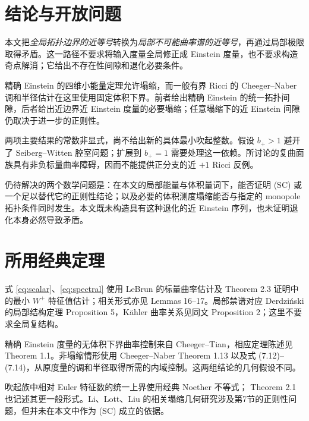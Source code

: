 \documentclass[UTF8,fontset=fandol,zihao=-4]{ctexart}
\theoremstyle{cn}
\numberwithin{equation}{section}
\begin{document}
\section{结论与开放问题}

本文把\emph{全局拓扑边界的近等号}转换为\emph{局部不可能曲率谱的近等号}，再通过局部极限取得矛盾。这一路径不要求将输入度量全局修正成 Einstein 度量，也不要求构造奇点解消；它给出不存在性间隙和退化必要条件。

精确 Einstein 的四维小能量定理允许塌缩，而一般有界 Ricci 的 Cheeger--Naber 调和半径估计在这里使用固定体积下界。前者给出精确 Einstein 的统一拓扑间隙，后者给出近边界近 Einstein 度量的必要塌缩；任意塌缩下的近 Einstein 间隙仍取决于进一步的正则性。

两项主要结果的常数非显式，尚不给出新的具体最小吹起整数。假设 $b_+>1$ 避开了 Seiberg--Witten 腔室问题；扩展到 $b_+=1$ 需要处理这一依赖。所讨论的复曲面族具有非负标量曲率障碍，因而不能提供正分支的近 $+1$ Ricci 反例。

仍待解决的两个数学问题是：在本文的局部能量与体积量词下，能否证明 (SC) 或一个足以替代它的正则性结论；以及必要的体积测度塌缩能否与指定的 monopole 拓扑条件同时发生。本文既未构造具有这种退化的近 Einstein 序列，也未证明退化本身必然导致矛盾。

\appendix
\section{所用经典定理}

式 \eqref{eq:scalar}、\eqref{eq:spectral} 使用 LeBrun 的标量曲率估计及 \cite{lebrun2001} Theorem 2.3 证明中的最小 $W^+$ 特征值估计；相关形式亦见 \cite{lebrun2004} Lemmas 16--17。局部禁谱对应 Derdziński 的局部结构定理 \cite{derd} Proposition 5，Kähler 曲率关系见同文 Proposition 2；这里不要求全局复结构。

精确 Einstein 度量的无体积下界曲率控制来自 Cheeger--Tian\cite{ct}，相应定理陈述见 \cite{gejiang} Theorem 1.1。非塌缩情形使用 Cheeger--Naber\cite{cn} Theorem 1.13 以及式 (7.12)--(7.14)，从原度量的调和半径取得所需的内域控制。这两组结论的几何假设不同。

吹起族中相对 Euler 特征数的统一上界使用经典 Noether 不等式；\cite{liedtke} Theorem 2.1 也记述其更一般形式。Li、Lott、Liu 的相关塌缩几何研究\cite{li,lott,liu}涉及第7节的正则性问题，但并未在本文中作为 (SC) 成立的依据。
\end{document}
